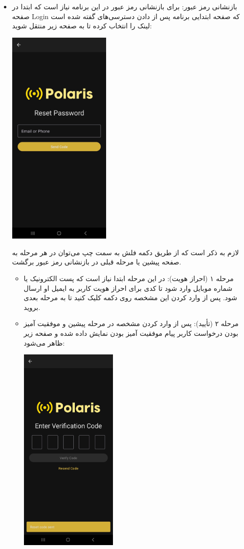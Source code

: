 \begin{itemize}
	\item  بازنشانی رمز عبور: برای بازنشانی رمز عبور در این برنامه نیاز است که ابتدا در صفحه Login که صفحه ابتدایی برنامه پس از دادن دسترسی‌های گفته شده است لینک  را انتخاب کرده تا به صفحه زیر منتقل شوید:
		\begin{center}
			\includegraphics[width=0.4\textwidth]{images/reset-pass-empty.jpg}
		\end{center}
	لازم به ذکر است که از طریق دکمه فلش به سمت چپ می‌توان در هر مرحله به صفحه پیشین یا مرحله قبلی در بازنشانی رمز عبور برگشت.
	\begin{itemize}
		\item  مرحله ۱ (احراز هویت):
		در این مرحله ابتدا نیاز است که پست الکترونیک یا شماره موبایل وارد شود تا کدی برای احراز هویت کاربر به ایمیل او ارسال شود. پس از وارد کردن این مشخصه روی دکمه  کلیک کنید تا به مرحله بعدی بروید.
		\item  مرحله ۲ (تأیید):
		پس از وارد کردن مشخصه در مرحله پیشین و موفقیت آمیز بودن درخواست کاربر پیام موفقیت آمیز بودن نمایش داده شده و صفحه زیر ظاهر می‌شود:
			\begin{center}
				\includegraphics[width=0.4\textwidth]{images/verification-empty.jpg}

\end{center}
\end{itemize}
\end{itemize}
